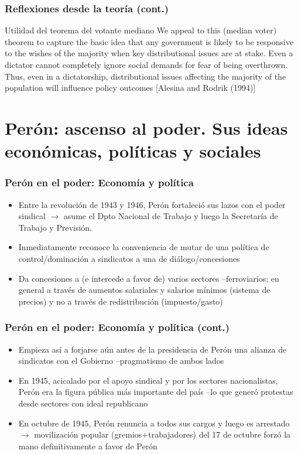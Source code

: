 \documentclass[14pt,aspectratio=169]{beamer}
\begin{document}
\begin{frame}\frametitle{Reflexiones desde la teoría (cont.)}
\begin{block}{Utilidad del teorema del votante mediano}
We appeal to this (median voter) theorem to capture the basic idea that
any government is likely to be responsive to the wishes of the majority when
key distributional issues are at stake. Even a dictator cannot completely
ignore social demands for fear of being overthrown. Thus, even in a
dictatorship, distributional issues affecting the majority of the population
will influence policy outcomes [Alesina and Rodrik (1994)]
\end{block}
\end{frame}



 \section{Perón: ascenso al poder. Sus ideas económicas, políticas
   y sociales}
  

\begin{frame}\frametitle{Perón en el poder: Economía y política}
   \begin{itemize} \itemsep 10pt
   \item Entre la revolución de 1943 y 1946, Perón fortaleció sus
     lazos con el poder sindical $\longrightarrow$ asume el
     Dpto Nacional de Trabajo y luego la Secretaría de Trabajo y Previsión. 
     \item Inmediatamente reconoce la conveniencia de mutar de una
       política de control/dominación a sindicatos a una de
       diálogo/concesiones
       \item Da concesiones a (e intercede a favor de) varios sectores
         --ferroviarios; en general a través de aumentos salariales y
         salarios mínimos (sistema de precios) y no a través de
         redistribución (impuesto/gasto)
   \end{itemize}
 \end{frame}


 

 \begin{frame}\frametitle{Perón en el poder: Economía y política (cont.)}
   \begin{itemize} \itemsep 10pt
   \item Empieza así a forjarse aún antes de la presidencia de Perón
     una alianza de sindicatos con el Gobierno --pragmatismo de ambos
     lados
     \item En 1945, acicalado por el apoyo sindical y por los sectores
       nacionalistas, Perón era la figura pública más importante del
       país --lo que generó protestas desde sectores con ideal republicano
       \item En octubre de 1945, Perón renuncia a todos sus cargos y
         luego es arrestado $\longrightarrow$ movilización popular
         (gremios+trabajadores) del 17 de octubre forzó la mano
         definitivamente a favor de Perón 
   \end{itemize}
 \end{frame}
\end{document}
